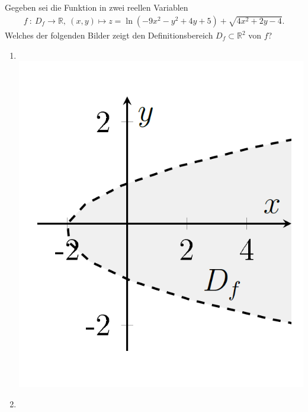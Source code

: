 \newpage

\subsection*{}
Gegeben sei die Funktion in zwei reellen Variablen
\begin{align*}
f \ : \ D_f \to \mathbb{R}, \
(x,y) \mapsto z = 
\ln(-9 x^2 -y^2 + 4 y +5) + \sqrt{4x^2 + 2y - 4 }.
\end{align*}
Welches der folgenden Bilder zeigt den Definitionsbereich $D_f \subset \mathbb{R}^2$ von $f$?
\renewcommand{\labelenumi}{(\alph{enumi})}
\begin{enumerate}
\item \text{} \\
\includegraphics[scale=0.3]{pictures/BildA}
\item \text{} \\

\end{enumerate}
